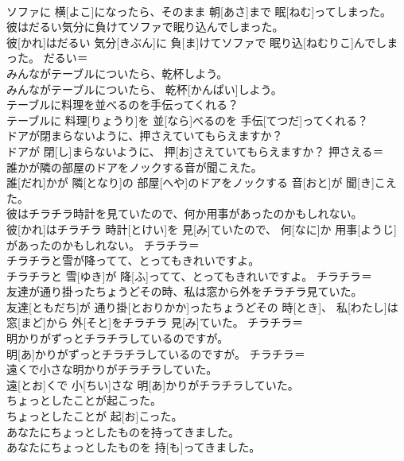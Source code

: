 \documentclass[8pt]{extreport}
\begin{document}
\begin{CJK}{UTF8}{min}
\\	ソファに 横[よこ]になったら、そのまま 朝[あさ]まで 眠[ねむ]ってしまった。	
\\	彼はだるい気分に負けてソファで眠り込んでしまった。	
\\	彼[かれ]はだるい 気分[きぶん]に 負[ま]けてソファで 眠り込[ねむりこ]んでしまった。	だるい＝ 
\\	みんながテーブルについたら、乾杯しよう。	
\\	みんながテーブルについたら、 乾杯[かんぱい]しよう。	
\\	テーブルに料理を並べるのを手伝ってくれる？	
\\	テーブルに 料理[りょうり]を 並[なら]べるのを 手伝[てつだ]ってくれる？	
\\	ドアが閉まらないように、押さえていてもらえますか？	
\\	ドアが 閉[し]まらないように、 押[お]さえていてもらえますか？	押さえる＝ 
\\	誰かが隣の部屋のドアをノックする音が聞こえた。	
\\	誰[だれ]かが 隣[となり]の 部屋[へや]のドアをノックする 音[おと]が 聞[き]こえた。	
\\	彼はチラチラ時計を見ていたので、何か用事があったのかもしれない。	
\\	彼[かれ]はチラチラ 時計[とけい]を 見[み]ていたので、 何[なに]か 用事[ようじ]があったのかもしれない。	チラチラ＝ 
\\	チラチラと雪が降ってて、とってもきれいですよ。	
\\	チラチラと 雪[ゆき]が 降[ふ]ってて、とってもきれいですよ。	チラチラ＝ 
\\	友達が通り掛ったちょうどその時、私は窓から外をチラチラ見ていた。	
\\	友達[ともだち]が 通り掛[とおりかか]ったちょうどその 時[とき]、 私[わたし]は 窓[まど]から 外[そと]をチラチラ 見[み]ていた。	チラチラ＝ 
\\	明かりがずっとチラチラしているのですが。	
\\	明[あ]かりがずっとチラチラしているのですが。	チラチラ＝ 
\\	遠くで小さな明かりがチラチラしていた。	
\\	遠[とお]くで 小[ちい]さな 明[あ]かりがチラチラしていた。	
\\	ちょっとしたことが起こった。	
\\	ちょっとしたことが 起[お]こった。	
\\	あなたにちょっとしたものを持ってきました。	
\\	あなたにちょっとしたものを 持[も]ってきました。	

\end{CJK}
\end{document}
